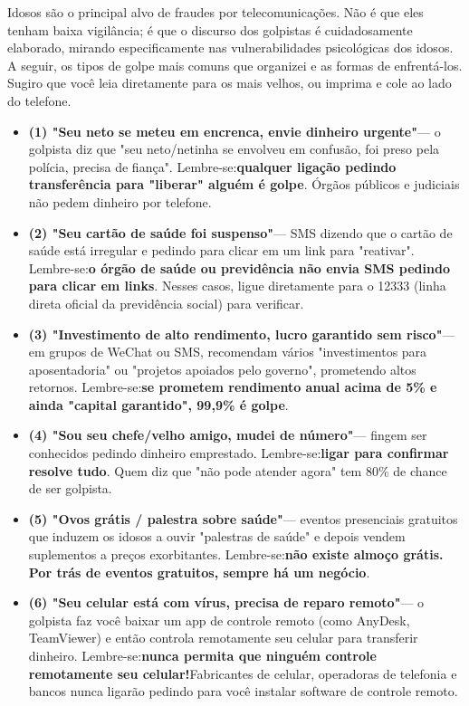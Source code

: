 
Idosos são o principal alvo de fraudes por telecomunicações. Não é que eles tenham baixa vigilância; é que o discurso dos golpistas é cuidadosamente elaborado, mirando especificamente nas vulnerabilidades psicológicas dos idosos. A seguir, os tipos de golpe mais comuns que organizei e as formas de enfrentá-los. Sugiro que você leia diretamente para os mais velhos, ou imprima e cole ao lado do telefone.


\begin{itemize}
  \item \textbf{(1) "Seu neto se meteu em encrenca, envie dinheiro urgente"}— o golpista diz que "seu neto/netinha se envolveu em confusão, foi preso pela polícia, precisa de fiança". Lembre-se:\textbf{qualquer ligação pedindo transferência para "liberar" alguém é golpe}. Órgãos públicos e judiciais não pedem dinheiro por telefone.
  \item \textbf{(2) "Seu cartão de saúde foi suspenso"}— SMS dizendo que o cartão de saúde está irregular e pedindo para clicar em um link para "reativar". Lembre-se:\textbf{o órgão de saúde ou previdência não envia SMS pedindo para clicar em links}. Nesses casos, ligue diretamente para o 12333 (linha direta oficial da previdência social) para verificar.
  \item \textbf{(3) "Investimento de alto rendimento, lucro garantido sem risco"}— em grupos de WeChat ou SMS, recomendam vários "investimentos para aposentadoria" ou "projetos apoiados pelo governo", prometendo altos retornos. Lembre-se:\textbf{se prometem rendimento anual acima de 5\% e ainda "capital garantido", 99,9\% é golpe}.
  \item \textbf{(4) "Sou seu chefe/velho amigo, mudei de número"}— fingem ser conhecidos pedindo dinheiro emprestado. Lembre-se:\textbf{ligar para confirmar resolve tudo}. Quem diz que "não pode atender agora" tem 80\% de chance de ser golpista.
  \item \textbf{(5) "Ovos grátis / palestra sobre saúde"}— eventos presenciais gratuitos que induzem os idosos a ouvir "palestras de saúde" e depois vendem suplementos a preços exorbitantes. Lembre-se:\textbf{não existe almoço grátis. Por trás de eventos gratuitos, sempre há um negócio}.
  \item \textbf{(6) "Seu celular está com vírus, precisa de reparo remoto"}— o golpista faz você baixar um app de controle remoto (como AnyDesk, TeamViewer) e então controla remotamente seu celular para transferir dinheiro. Lembre-se:\textbf{nunca permita que ninguém controle remotamente seu celular!}Fabricantes de celular, operadoras de telefonia e bancos nunca ligarão pedindo para você instalar software de controle remoto.
\end{itemize}

